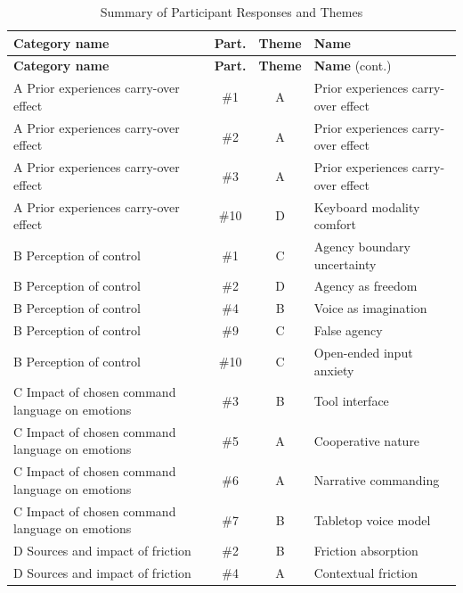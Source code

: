 \begin{longtable}{|p{}|c|c|>{\raggedright\arraybackslash}p{}|}
   
    \caption{Summary of Participant Responses and Themes} \label{tab:responses} \\
    
    \hline
    \textbf{Category name} & \textbf{Part.} & \textbf{Theme} & \textbf{Name} \\ \hline
    \endfirsthead
    
    \hline
    \textbf{Category name} & \textbf{Part.} & \textbf{Theme} & \textbf{Name} (cont.) \\ \hline
    \endhead
    
    A Prior experiences carry-over effect & \#1 & A & Prior experiences carry-over effect \\ \hline
    A Prior experiences carry-over effect & \#2 & A & Prior experiences carry-over effect \\ \hline
    A Prior experiences carry-over effect & \#3 & A & Prior experiences carry-over effect \\ \hline
    A Prior experiences carry-over effect & \#10 & D & Keyboard modality comfort \\ \hline
    B Perception of control & \#1 & C & Agency boundary uncertainty \\ \hline
    B Perception of control & \#2 & D & Agency as freedom \\ \hline
    B Perception of control & \#4 & B & Voice as imagination \\ \hline
    B Perception of control & \#9 & C & False agency \\ \hline
    B Perception of control & \#10 & C & Open-ended input anxiety \\ \hline
    C Impact of chosen command language on emotions & \#3 & B & Tool interface \\ \hline
    C Impact of chosen command language on emotions & \#5 & A & Cooperative nature \\ \hline
    C Impact of chosen command language on emotions & \#6 & A & Narrative commanding \\ \hline
    C Impact of chosen command language on emotions & \#7 & B & Tabletop voice model \\ \hline
    D Sources and impact of friction & \#2 & B & Friction absorption \\ \hline
    D Sources and impact of friction & \#4 & A & Contextual friction \\ \hline

\end{longtable}
